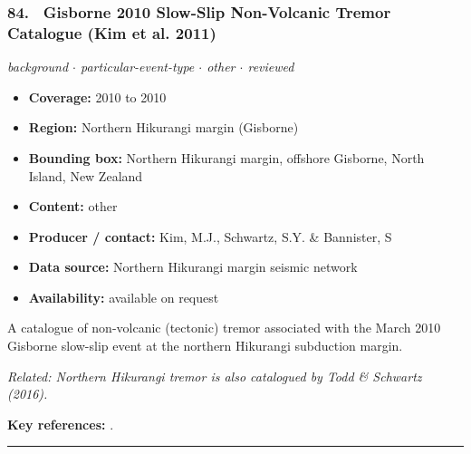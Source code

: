 \documentclass[10pt,a4paper]{article}
\newcommand{\catentryrule}{\par\vspace{3pt}\noindent\textcolor{rulegrey}{\rule{\linewidth}{0.3pt}}\par\vspace{5pt}}
\newcommand{\kv}[2]{\item \textbf{#1:} #2}
\begin{document}
\subsubsection*{\hypertarget{c:84}{84.}~ Gisborne 2010 Slow-Slip Non-Volcanic Tremor Catalogue (Kim et al. 2011)}
{\small\itshape background $\cdot$ particular-event-type $\cdot$ other $\cdot$ reviewed}\par\vspace{2pt}
\begin{itemize}[leftmargin=1.3em,itemsep=0.6pt,topsep=1pt,parsep=0pt]
\kv{Coverage}{2010 to 2010}
\kv{Region}{Northern Hikurangi margin (Gisborne)}
\kv{Bounding box}{Northern Hikurangi margin, offshore Gisborne, North Island, New Zealand}
\kv{Content}{other}
\kv{Producer / contact}{Kim, M.J., Schwartz, S.Y. \& Bannister, S}
\kv{Data source}{Northern Hikurangi margin seismic network}
\kv{Availability}{available on request}
\end{itemize}
\par\vspace{2pt}A catalogue of non-volcanic (tectonic) tremor associated with the March 2010 Gisborne slow-slip event at the northern Hikurangi subduction margin.
\par{\small\itshape Related: Northern Hikurangi tremor is also catalogued by Todd \& Schwartz (2016).}
\par\vspace{2pt}\textbf{Key references:} \cite{Kim2011}.
\catentryrule
\end{document}
